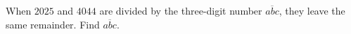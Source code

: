 When $2025$ and $4044$ are divided by the three-digit number $\overline{abc}$, they leave the same remainder. Find $\overline{abc}$.
